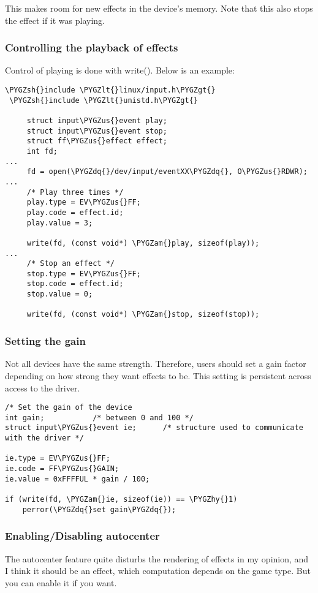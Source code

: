 \documentclass[a4paper,8pt,english]{sphinxmanual}
\def\PYGZus{\char`\_}
\def\PYGZam{\char`\&}
\def\PYGZlt{\char`\<}
\def\PYGZgt{\char`\>}
\def\PYGZsh{\char`\#}
\def\PYGZhy{\char`\-}
\def\PYGZdq{\char`\"}
\begin{document}
This makes room for new effects in the device's memory. Note that this also
stops the effect if it was playing.


\subsubsection{Controlling the playback of effects}
\label{input/ff:controlling-the-playback-of-effects}
Control of playing is done with write(). Below is an example:

\begin{Verbatim}[commandchars=\\\{\}]
 \PYGZsh{}include \PYGZlt{}linux/input.h\PYGZgt{}
 \PYGZsh{}include \PYGZlt{}unistd.h\PYGZgt{}

     struct input\PYGZus{}event play;
     struct input\PYGZus{}event stop;
     struct ff\PYGZus{}effect effect;
     int fd;
...
     fd = open(\PYGZdq{}/dev/input/eventXX\PYGZdq{}, O\PYGZus{}RDWR);
...
     /* Play three times */
     play.type = EV\PYGZus{}FF;
     play.code = effect.id;
     play.value = 3;

     write(fd, (const void*) \PYGZam{}play, sizeof(play));
...
     /* Stop an effect */
     stop.type = EV\PYGZus{}FF;
     stop.code = effect.id;
     stop.value = 0;

     write(fd, (const void*) \PYGZam{}stop, sizeof(stop));
\end{Verbatim}


\subsubsection{Setting the gain}
\label{input/ff:setting-the-gain}
Not all devices have the same strength. Therefore, users should set a gain
factor depending on how strong they want effects to be. This setting is
persistent across access to the driver.

\begin{Verbatim}[commandchars=\\\{\}]
/* Set the gain of the device
int gain;           /* between 0 and 100 */
struct input\PYGZus{}event ie;      /* structure used to communicate with the driver */

ie.type = EV\PYGZus{}FF;
ie.code = FF\PYGZus{}GAIN;
ie.value = 0xFFFFUL * gain / 100;

if (write(fd, \PYGZam{}ie, sizeof(ie)) == \PYGZhy{}1)
    perror(\PYGZdq{}set gain\PYGZdq{});
\end{Verbatim}


\subsubsection{Enabling/Disabling autocenter}
\label{input/ff:enabling-disabling-autocenter}
The autocenter feature quite disturbs the rendering of effects in my opinion,
and I think it should be an effect, which computation depends on the game
type. But you can enable it if you want.
\end{document}

